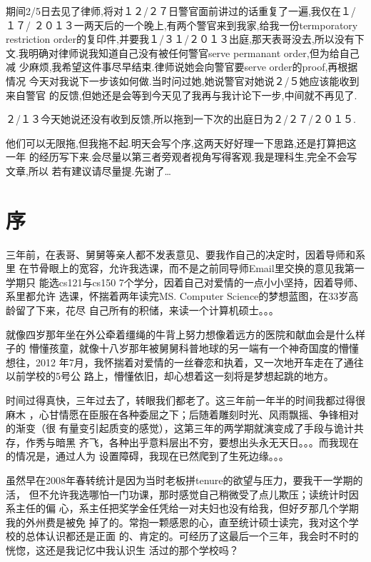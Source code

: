\documentclass[12pt]{book}
\begin{document}
期间2/5日去见了律师,将对１２/２７日警官面前讲过的话重复了一遍,我仅在１/１７/
２０１３一两天后的一个晚上,有两个警官来到我家,给我一份termporatory 
restriction order的复印件,并要我１/３１/２０１３出庭,那天表哥没去,所以没有下
文.我明确对律师说我知道自己没有被任何警官serve permanant order,但为给自己减
少麻烦,我希望这件事尽早结束.律师说她会向警官要serve order的proof,再根据情况
今天对我说下一步该如何做.当时问过她,她说警官对她说２/５她应该能收到来自警官
的反馈,但她还是会等到今天见了我再与我计论下一步,中间就不再见了.

２/１３今天她说还没有收到反馈,所以拖到一下次的出庭日为２/２７/２０１５.

他们可以无限拖,但我拖不起.明天会写个序,这两天好好理一下思路,还是打算把这一年
的经历写下来.会尽量以第三者旁观者视角写得客观.我是理科生,完全不会写文章,所以
若有建议请尽量提.先谢了\ldots{}

\chapter{序}
\label{sec-52}

  三年前，在表哥、舅舅等亲人都不发表意见、要我作自己的决定时，因着导师和系里
在节骨眼上的宽容，允许我选课，而不是之前同导师Email里交换的意见我第一学期只
能选cs121与cs150 7个学分，因着自己对爱情的一点小小坚持，因着导师、系里都允许
选课，怀揣着两年读完MS. Computer Science的梦想蓝图，在33岁高龄留了下来，花尽
自己所有的积储，来读一个计算机硕士。。。

就像四岁那年坐在外公牵着缰绳的牛背上努力想像着远方的医院和献血会是什么样子的
懵懂孩童，就像十八岁那年被舅舅科普地球的另一端有一个神奇国度的懵懂想往，2012
年7月，我怀揣着对爱情的一丝眷恋和执着，又一次地开车走在了通往以前学校的5号公
路上，懵懂依旧，却心想着这一刻将是梦想起跳的地方。

时间过得真快，三年过去了，转眼我们都老了。这三年前一年半的时间我都过得很麻木
，心甘情愿在臣服在各种委屈之下；后随着雕刻时光、风雨飘摇、争锋相对的渐变（很
有量变引起质变的感觉），这第三年的两学期就演变成了手段与诡计共存，作秀与暗黑
齐飞，各种出乎意料层出不穷，要想出头永无天日。。。而我现在的情况是，通过人为
设置障碍，我现在已然爬到了生死边缘。。。

虽然早在2008年春转统计是因为当时老板拼tenure的欲望与压力，要我干一学期的活，
但不允许我选哪怕一门功课，那时感觉自己稍微受了点儿欺压；读统计时因系主任的偏
心，系主任把奖学金任凭给一对夫妇也没有给我，但好歹那几个学期我的外州费是被免
掉了的。常抱一颗感恩的心，直至统计硕士读完，我对这个学校的总体认识都还是正面
的、肯定的。可经历了这最后一个三年，我会时不时的恍惚，这还是我记忆中我认识生
活过的那个学校吗？
\end{document}
